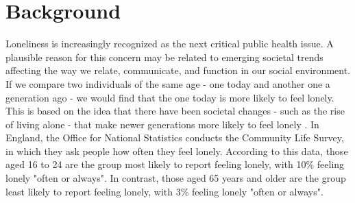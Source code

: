 \section{Background}
Loneliness is increasingly recognized as the next critical public health issue. A plausible reason for this concern may be related to emerging societal trends affecting the way we relate, communicate, and function in our social environment. If we compare two individuals of the same age - one today and another one a generation ago - we would find that the one today is more likely to feel lonely. This is based on the idea that there have been societal changes - such as the rise of living alone - that make newer generations more likely to feel lonely \cite{owid-loneliness-epidemic}. In England, the Office for National Statistics conducts the Community Life Survey, in which they ask people how often they feel lonely. According to this data, those aged 16 to 24 are the group most likely to report feeling lonely, with 10\% feeling lonely "often or always". In contrast, those aged 65 years and older are the group least likely to report feeling lonely, with 3\% feeling lonely "often or always". \\
